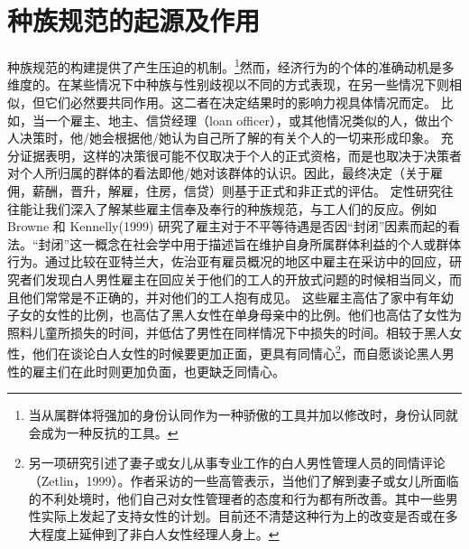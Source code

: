 \documentclass[UTF8]{ctexart}
\begin{document}
\section{种族规范的起源及作用} 种族规范的构建提供了产生压迫的机制。\footnote[7]{当从属群体将强加的身份认同作为一种骄傲的工具并加以修改时，身份认同就会成为一种反抗的工具。}然而，经济行为的个体的准确动机是多维度的。在某些情况下中种族与性别歧视以不同的方式表现，在另一些情况下则相似，但它们必然要共同作用。这二者在决定结果时的影响力视具体情况而定。
比如，当一个雇主、地主、信贷经理（loan officer），或其他情况类似的人，做出个人决策时，他/她会根据他/她认为自己所了解的有关个人的一切来形成印象。 充分证据表明，这样的决策很可能不仅取决于个人的正式资格，而是也取决于决策者对个人所归属的群体的看法即他/她对该群体的认识。因此，最终决定（关于雇佣，薪酬，晋升，解雇，住房，信贷）则基于正式和非正式的评估。
定性研究往往能让我们深入了解某些雇主信奉及奉行的种族规范，与工人们的反应。例如 Browne 和 Kennelly(1999) 研究了雇主对于不平等待遇是否因“封闭”因素而起的看法。“封闭”这一概念在社会学中用于描述旨在维护自身所属群体利益的个人或群体行为。通过比较在亚特兰大，佐治亚有雇员概况的地区中雇主在采访中的回应，研究者们发现白人男性雇主在回应关于他们的工人的开放式问题的时候相当同义，而且他们常常是不正确的，并对他们的工人抱有成见。
这些雇主高估了家中有年幼子女的女性的比例，也高估了黑人女性在单身母亲中的比例。他们也高估了女性为照料儿童所损失的时间，并低估了男性在同样情况下中损失的时间。相较于黑人女性，他们在谈论白人女性的时候要更加正面，更具有同情心\footnote[8]{另一项研究引述了妻子或女儿从事专业工作的白人男性管理人员的同情评论（Zetlin，1999）。作者采访的一些高管表示，当他们了解到妻子或女儿所面临的不利处境时，他们自己对女性管理者的态度和行为都有所改善。其中一些男性实际上发起了支持女性的计划。目前还不清楚这种行为上的改变是否或在多大程度上延伸到了非白人女性经理人身上。}，而自愿谈论黑人男性的雇主们在此时则更加负面，也更缺乏同情心。
\end{document}
